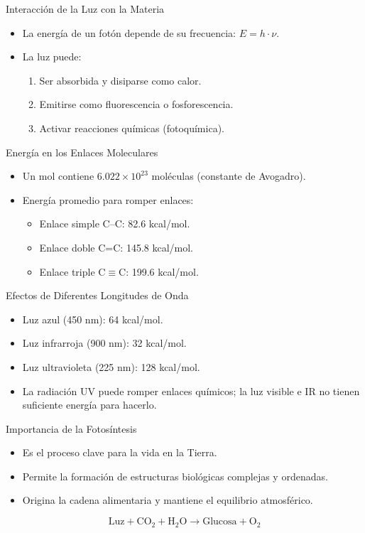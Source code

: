 \documentclass[main.tex]{subfiles}
\begin{document}
\begin{frame}{Interacción de la Luz con la Materia}
  \begin{itemize}
    \item La energía de un fotón depende de su frecuencia: \( E = h \cdot \nu \).
    \item La luz puede:
    \begin{enumerate}
      \item Ser absorbida y disiparse como calor.
      \item Emitirse como fluorescencia o fosforescencia.
      \item Activar reacciones químicas (fotoquímica).
    \end{enumerate}
  \end{itemize}
\end{frame}

\begin{frame}{Energía en los Enlaces Moleculares}
  \begin{itemize}
    \item Un mol contiene \( 6.022 \times 10^{23} \) moléculas (constante de Avogadro).
    \item Energía promedio para romper enlaces:
    \begin{itemize}
      \item Enlace simple C–C: 82.6 kcal/mol.
      \item Enlace doble C=C: 145.8 kcal/mol.
      \item Enlace triple C$\equiv$C: 199.6 kcal/mol.
    \end{itemize}
  \end{itemize}
\end{frame}


\begin{frame}{Efectos de Diferentes Longitudes de Onda}
  \begin{itemize}
    \item Luz azul (450 nm): 64 kcal/mol.
    \item Luz infrarroja (900 nm): 32 kcal/mol.
    \item Luz ultravioleta (225 nm): 128 kcal/mol.
    \item La radiación UV puede romper enlaces químicos; la luz visible e IR no tienen suficiente energía para hacerlo.
  \end{itemize}
\end{frame}

\begin{frame}{Importancia de la Fotosíntesis}
  \begin{itemize}
    \item Es el proceso clave para la vida en la Tierra.
    \item Permite la formación de estructuras biológicas complejas y ordenadas.
    \item Origina la cadena alimentaria y mantiene el equilibrio atmosférico.
  \end{itemize}
  \[
  \text{Luz} + \text{CO}_2 + \text{H}_2\text{O} \rightarrow \text{Glucosa} + \text{O}_2
  \]
\end{frame}
\end{document}

